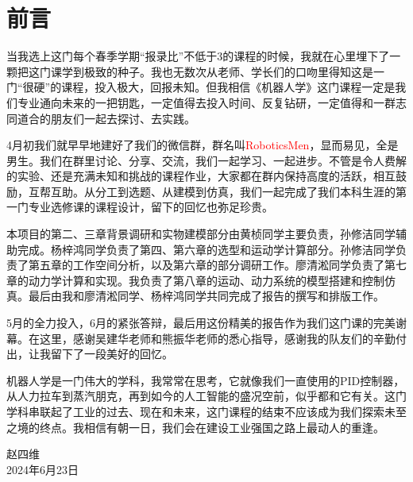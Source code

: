\documentclass[12pt]{ctexart}
\begin{document}



\section{前言}
当我选上这门每个春季学期“报录比”不低于3的课程的时候，我就在心里埋下了一颗把这门课学到极致的种子。我也无数次从老师、学长们的口吻里得知这是一门“很硬”的课程，投入极大，回报未知。但我相信《机器人学》这门课程一定是我们专业通向未来的一把钥匙，一定值得去投入时间、反复钻研，一定值得和一群志同道合的朋友们一起去探讨、去实践。

4月初我们就早早地建好了我们的微信群，群名叫\textcolor{red}{RoboticsMen}，显而易见，全是男生。我们在群里讨论、分享、交流，我们一起学习、一起进步。不管是令人费解的实验、还是充满未知和挑战的课程作业，大家都在群内保持高度的活跃，相互鼓励，互帮互助。从分工到选题、从建模到仿真，我们一起完成了我们本科生涯的第一门专业选修课的课程设计，留下的回忆也弥足珍贵。

本项目的第二、三章背景调研和实物建模部分由黄桢同学主要负责，孙修洁同学辅助完成。杨梓鸿同学负责了第四、第六章的选型和运动学计算部分。孙修洁同学负责了第五章的工作空间分析，以及第六章的部分调研工作。廖清淞同学负责了第七章的动力学计算和实现。我负责了第八章的运动、动力系统的模型搭建和控制仿真。最后由我和廖清淞同学、杨梓鸿同学共同完成了报告的撰写和排版工作。

5月的全力投入，6月的紧张答辩，最后用这份精美的报告作为我们这门课的完美谢幕。在这里，感谢吴建华老师和熊振华老师的悉心指导，感谢我的队友们的辛勤付出，让我留下了一段美好的回忆。

机器人学是一门伟大的学科，我常常在思考，它就像我们一直使用的PID控制器，从人力拉车到蒸汽朋克，再到如今的人工智能的盛况空前，似乎都和它有关。这门学科串联起了工业的过去、现在和未来，这门课程的结束不应该成为我们探索未至之境的终点。我相信有朝一日，我们会在建设工业强国之路上最动人的重逢。

\begin{flushright}
    \fontsize{16}{20}\selectfont\kaishu 赵四维{ \quad \quad \quad \quad}\\
    \fontsize{16}{20}\selectfont\kaishu 2024年6月23日
\end{flushright}


\newpage
\tableofcontents


\newpage
\pagestyle{fancy}
\fancyhf{}
\fancyfoot[C]{\thepage}


\end{document}
